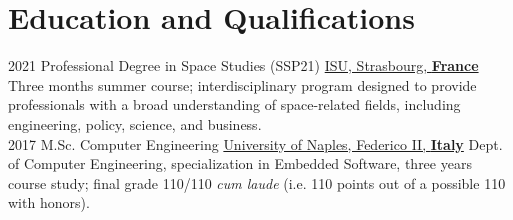 \documentclass[letterpaper]{twentysecondcv} %
\begin{document}
\section{Education and Qualifications}
\begin{twenty}
	\twentyitem
        {2021}
    	{}
        {Professional Degree in Space Studies (SSP21)}
        {\href{https://www.isunet.edu/ssp/}{ISU, Strasbourg, \textbf{France}}}
        {}
        {
            Three months summer course; interdisciplinary program designed to provide professionals with a broad understanding of space-related fields, including engineering, policy, science, and business.
        }\\
	\twentyitem
        {2017}
    	{}
        {M.Sc. Computer Engineering}
        {\href{http://www.scuolapsb.unina.it/}{University of Naples, Federico II, \textbf{Italy}}}
        {}
        {
            Dept. of Computer Engineering, specialization in Embedded Software, three years course study; final grade 110/110 \textit{cum laude} (i.e. 110 points out of a possible 110 with honors).
        }
\end{twenty}
\end{document}
